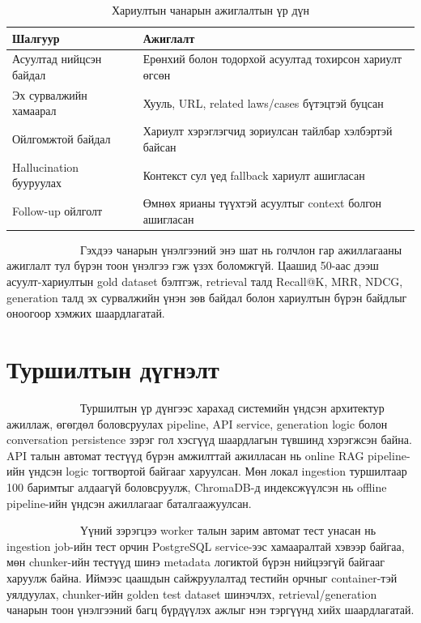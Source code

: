 \documentclass[12pt,A4]{report}
\begin{document}
\begin{table}[H]
\renewcommand{\tablename}{Хүснэгт}
\centering
\caption{Хариултын чанарын ажиглалтын үр дүн}
\begin{tabular}{|l|l|}
\hline
\textbf{Шалгуур} & \textbf{Ажиглалт} \\
\hline
Асуултад нийцсэн байдал & Ерөнхий болон тодорхой асуултад тохирсон хариулт өгсөн \\
Эх сурвалжийн хамаарал & Хууль, URL, related laws/cases бүтэцтэй буцсан \\
Ойлгомжтой байдал & Хариулт хэрэглэгчид зориулсан тайлбар хэлбэртэй байсан \\
Hallucination бууруулах & Контекст сул үед fallback хариулт ашигласан \\
Follow-up ойлголт & Өмнөх ярианы түүхтэй асуултыг context болгон ашигласан \\
\hline
\end{tabular}
\label{tab:answer_quality}
\end{table}

\ \ \ \ \ \ \ \ \  \ \ \ \ Гэхдээ чанарын үнэлгээний энэ шат нь
голчлон гар ажиллагааны ажиглалт тул бүрэн тоон үнэлгээ гэж үзэх
боломжгүй. Цаашид 50-аас дээш асуулт-хариултын gold dataset бэлтгэж,
retrieval талд Recall@K, MRR, NDCG, generation талд эх сурвалжийн
үнэн зөв байдал болон хариултын бүрэн байдлыг оноогоор хэмжих
шаардлагатай.

\section{Туршилтын дүгнэлт}

\ \ \ \ \ \ \ \ \  \ \ \ \ Туршилтын үр дүнгээс харахад системийн
үндсэн архитектур ажиллаж, өгөгдөл боловсруулах pipeline, API service,
generation logic болон conversation persistence зэрэг гол хэсгүүд
шаардлагын түвшинд хэрэгжсэн байна. API талын автомат тестүүд бүрэн
амжилттай ажилласан нь online RAG pipeline-ийн үндсэн logic тогтвортой
байгааг харуулсан. Мөн локал ingestion туршилтаар 100 баримтыг алдаагүй
боловсруулж, ChromaDB-д индексжүүлсэн нь offline pipeline-ийн үндсэн
ажиллагааг баталгаажуулсан.

\ \ \ \ \ \ \ \ \  \ \ \ \ Үүний зэрэгцээ worker талын зарим автомат
тест унасан нь ingestion job-ийн тест орчин PostgreSQL service-ээс
хамааралтай хэвээр байгаа, мөн chunker-ийн тестүүд шинэ metadata
логиктой бүрэн нийцээгүй байгааг харуулж байна. Иймээс цаашдын
сайжруулалтад тестийн орчныг container-тэй уялдуулах, chunker-ийн
golden test dataset шинэчлэх, retrieval/generation чанарын тоон
үнэлгээний багц бүрдүүлэх ажлыг нэн тэргүүнд хийх шаардлагатай.
\end{document}
